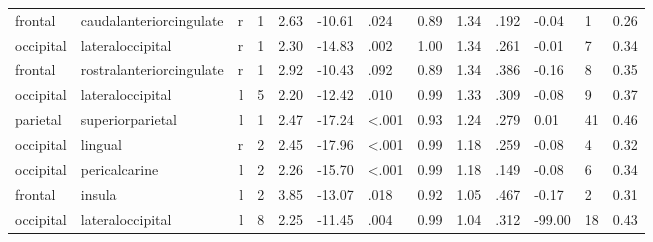 \documentclass{article}
\begin{document}
\begin{longtable}{llrR{1.3cm}R{1cm}R{1.3cm}R{1cm}R{1cm}R{1.3cm}R{1cm}R{1.8cm}R{1.3cm}R{1.8cm}}
   frontal &   caudalanteriorcingulate &    r &         1 &                  2.63 &           -10.61 &               .024 &                               0.89 &                          1.34 &                            .192 &  -0.04 &      1 &      0.26 \\
 occipital &          lateraloccipital &    r &         1 &                  2.30 &           -14.83 &               .002 &                               1.00 &                          1.34 &                            .261 &  -0.01 &      7 &      0.34 \\
   frontal &  rostralanteriorcingulate &    r &         1 &                  2.92 &           -10.43 &               .092 &                               0.89 &                          1.34 &                            .386 &  -0.16 &      8 &      0.35 \\
 occipital &          lateraloccipital &    l &         5 &                  2.20 &           -12.42 &               .010 &                               0.99 &                          1.33 &                            .309 &  -0.08 &      9 &      0.37 \\
  parietal &          superiorparietal &    l &         1 &                  2.47 &           -17.24 &      \textless.001 &                               0.93 &                          1.24 &                            .279 &   0.01 &     41 &      0.46 \\
 occipital &                   lingual &    r &         2 &                  2.45 &           -17.96 &      \textless.001 &                               0.99 &                          1.18 &                            .259 &  -0.08 &      4 &      0.32 \\
 occipital &             pericalcarine &    l &         2 &                  2.26 &           -15.70 &      \textless.001 &                               0.99 &                          1.18 &                            .149 &  -0.08 &      6 &      0.34 \\
   frontal &                    insula &    l &         2 &                  3.85 &           -13.07 &               .018 &                               0.92 &                          1.05 &                            .467 &  -0.17 &      2 &      0.31 \\
 occipital &          lateraloccipital &    l &         8 &                  2.25 &           -11.45 &               .004 &                               0.99 &                          1.04 &                            .312 & -99.00 &     18 &      0.43 \\

\end{longtable}
\end{document}
